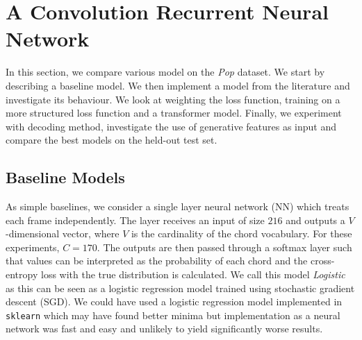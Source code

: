 \chapter{A Convolution Recurrent Neural Network}

In this section, we compare various model on the \emph{Pop} dataset. We start by describing a baseline model. We then implement a model from the literature and investigate its behaviour. We look at weighting the loss function, training on a more structured loss function and a transformer model. Finally, we experiment with decoding method, investigate the use of generative features as input and compare the best models on the held-out test set.

\section{Baseline Models}

As simple baselines, we consider a single layer neural network (NN) which treats each frame independently. The layer receives an input of size $216$ and outputs a $V$-dimensional vector, where $V$ is the cardinality of the chord vocabulary. For these experiments, $C=170$. The outputs are then passed through a softmax layer such that values can be interpreted as the probability of each chord and the cross-entropy loss with the true distribution is calculated. We call this model \emph{Logistic} as this can be seen as a logistic regression model trained using stochastic gradient descent (SGD). We could have used a logistic regression model implemented in \texttt{sklearn} which may have found better minima but implementation as a neural network was fast and easy and unlikely to yield significantly worse results.


